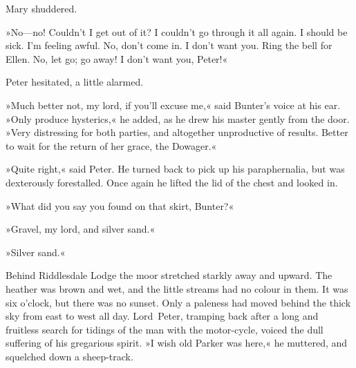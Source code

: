 Mary shuddered.

»No—no! Couldn't I get out of it? I couldn't go through it all again.  I should be sick. I'm feeling awful. No, don't come in. I don't want you. Ring the bell for Ellen. No, let go; go away! I don't want you, Peter!«

Peter hesitated, a little alarmed.

»Much better not, my lord, if you'll excuse me,« said Bunter's voice at his ear. »Only produce hysterics,« he added, as he drew his master gently from the door. »Very distressing for both parties, and altogether unproductive of results. Better to wait for the return of her grace, the Dowager.«

»Quite right,« said Peter. He turned back to pick up his paraphernalia, but was dexterously forestalled. Once again he lifted the lid of the chest and looked in.

»What did you say you found on that skirt, Bunter?«

»Gravel, my lord, and silver sand.«

»Silver sand.«

\divider

Behind Riddlesdale Lodge the moor stretched starkly away and upward.  The heather was brown and wet, and the little streams had no colour in them. It was six o'clock, but there was no sunset. Only a paleness had moved behind the thick sky from east to west all day. Lord~Peter, tramping back after a long and fruitless search for tidings of the man with the motor-cycle, voiced the dull suffering of his gregarious spirit. »I wish old Parker was here,« he muttered, and squelched down a sheep-track.

